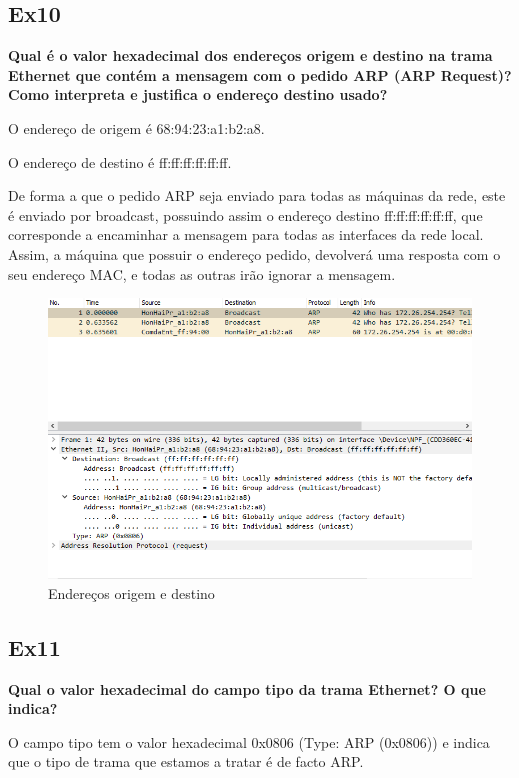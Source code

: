 \documentclass{article}
\begin{document}
\subsection{Ex10}
\textbf{Qual é o valor hexadecimal dos endereços origem e destino na trama Ethernet que contém a mensagem com o pedido ARP (ARP Request)? Como interpreta e justifica o endereço destino usado?}\\\par
O endereço de origem é 68:94:23:a1:b2:a8.\par
O endereço de destino é ff:ff:ff:ff:ff:ff.\par
De forma a que o pedido ARP seja enviado para todas as máquinas da rede, este é enviado por broadcast, possuindo assim o endereço destino ff:ff:ff:ff:ff:ff, que corresponde a encaminhar a mensagem para todas as interfaces da rede local. Assim, a máquina que possuir o endereço pedido, devolverá uma resposta com o seu endereço MAC, e todas as outras irão ignorar a mensagem.
\begin{figure}[h]
	\centering
	\includegraphics[scale = 0.43]{ex10.PNG}
	\caption{Endereços origem e destino}
\end{figure}

\subsection{Ex11}
\textbf{Qual o valor hexadecimal do campo tipo da trama Ethernet? O que indica?}\\\par
O campo tipo tem o valor hexadecimal 0x0806 (Type: ARP (0x0806)) e indica que o tipo de trama que estamos a tratar é de facto ARP.
\end{document}
